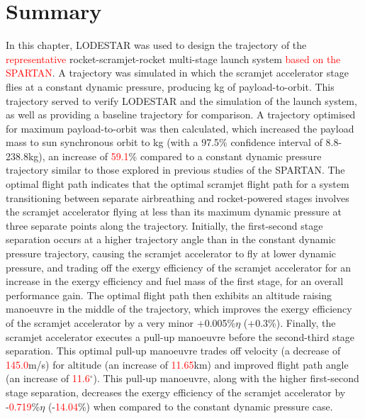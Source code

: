 \section{Summary}


In this chapter, LODESTAR was used to design the trajectory of the \textcolor{red}{representative} rocket-scramjet-rocket multi-stage launch system \textcolor{red}{based on the SPARTAN}. 
A trajectory was simulated in which the scramjet accelerator stage flies at a constant dynamic pressure, producing \PayloadToOrbitConstqNoReturn kg of payload-to-orbit. This trajectory served to verify LODESTAR and the simulation of  the launch system, as well as providing a baseline trajectory for comparison. 
A trajectory optimised for maximum payload-to-orbit was then calculated, which increased the payload mass to sun synchronous orbit to \PayloadToOrbitStandardNoReturn kg (with a 97.5\% confidence interval of 8.8-238.8kg), an increase of \textcolor{red}{59.1}\% compared to a constant dynamic pressure trajectory similar to those explored in previous studies of the SPARTAN\cite{Preller2017b}.
  The optimal flight path indicates that the optimal scramjet flight path for a system transitioning between separate airbreathing and rocket-powered stages involves the scramjet accelerator flying at less than its maximum dynamic pressure at three separate points along the trajectory. 
  Initially, the first-second stage separation occurs at a higher trajectory angle than in the constant dynamic pressure trajectory, causing the scramjet accelerator to fly at lower dynamic pressure, and trading off the exergy efficiency of the scramjet accelerator for an increase in the exergy efficiency and fuel mass of the first stage, for an overall performance gain. 
  The optimal flight path then exhibits an altitude raising manoeuvre in the middle of the trajectory, which improves the exergy efficiency of the scramjet accelerator by a very minor +0.005\%$\eta$ (+0.3\%). 
  Finally, the scramjet accelerator executes a pull-up manoeuvre before the second-third stage separation. This optimal pull-up manoeuvre trades off velocity (a decrease of \textcolor{red}{145.0}m/s) for altitude (an increase of \textcolor{red}{11.65}km) and improved flight path angle (an increase of \textcolor{red}{11.6}$^\circ$). This pull-up manoeuvre, along with the higher first-second stage separation, decreases the exergy efficiency of the scramjet accelerator by -\textcolor{red}{0.719}\%$\eta$ (-\textcolor{red}{14.04}\%) when compared to the constant dynamic pressure case. 
